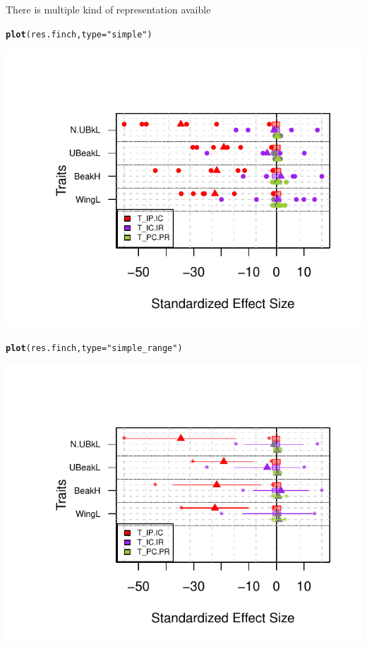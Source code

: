 \documentclass[12pt]{article}\usepackage[]{graphicx}\usepackage[]{color}
\makeatletter
\def\maxwidth{ %
  \ifdim\Gin@nat@width>\linewidth
    \linewidth
  \else
    \Gin@nat@width
  \fi
}
\newcommand{\hlstr}[1]{\textcolor[rgb]{0.192,0.494,0.8}{#1}}%
\newcommand{\hlstd}[1]{\textcolor[rgb]{0.345,0.345,0.345}{#1}}%
\newcommand{\hlkwc}[1]{\textcolor[rgb]{0.333,0.667,0.333}{#1}}%
\newcommand{\hlkwd}[1]{\textcolor[rgb]{0.737,0.353,0.396}{\textbf{#1}}}%
\newenvironment{kframe}{%
 \def\at@end@of@kframe{}%
 \ifinner\ifhmode%
  \def\at@end@of@kframe{\end{minipage}}%
  \begin{minipage}{\columnwidth}%
 \fi\fi%
 \def\FrameCommand##1{\hskip\@totalleftmargin \hskip-\fboxsep
 \colorbox{shadecolor}{##1}\hskip-\fboxsep
     \hskip-\linewidth \hskip-\@totalleftmargin \hskip\columnwidth}%
 \MakeFramed {\advance\hsize-\width
   \@totalleftmargin\z@ \linewidth\hsize
   \@setminipage}}%
 {\par\unskip\endMakeFramed%
 \at@end@of@kframe}
\newenvironment{knitrout}{}{} %
\makeatother
\begin{document}
There is multiple kind of representation avaible
\begin{knitrout}
\color{fgcolor}\begin{kframe}
\begin{alltt}
\hlkwd{plot}\hlstd{(res.finch,} \hlkwc{type}\hlstd{=}\hlstr{"simple"}\hlstd{)}
\end{alltt}
\end{kframe}

{\centering \includegraphics[width=\maxwidth]{figure/unnamed-chunk-301} 

}


\begin{kframe}\begin{alltt}
\hlkwd{plot}\hlstd{(res.finch,} \hlkwc{type}\hlstd{=}\hlstr{"simple_range"}\hlstd{)}
\end{alltt}
\end{kframe}

{\centering \includegraphics[width=\maxwidth]{figure/unnamed-chunk-302} 

}
\end{knitrout}
\end{document}
